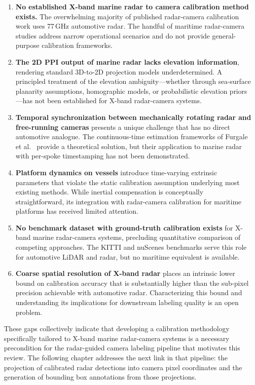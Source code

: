 \begin{enumerate}[leftmargin=*]
  \item \textbf{No established X-band marine radar to camera calibration method exists.} The overwhelming majority of published radar-camera calibration work uses 77\,GHz automotive radar. The handful of maritime radar-camera studies \cite{han2020autonomous, xu2025multistage} address narrow operational scenarios and do not provide general-purpose calibration frameworks.

  \item \textbf{The 2D PPI output of marine radar lacks elevation information}, rendering standard 3D-to-2D projection models underdetermined. A principled treatment of the elevation ambiguity---whether through sea-surface planarity assumptions, homographic models, or probabilistic elevation priors---has not been established for X-band radar-camera systems.

  \item \textbf{Temporal synchronization between mechanically rotating radar and free-running cameras} presents a unique challenge that has no direct automotive analogue. The continuous-time estimation frameworks of Furgale et al.\ \cite{furgale2013unified} provide a theoretical solution, but their application to marine radar with per-spoke timestamping has not been demonstrated.

  \item \textbf{Platform dynamics on vessels} introduce time-varying extrinsic parameters that violate the static calibration assumption underlying most existing methods. While inertial compensation is conceptually straightforward, its integration with radar-camera calibration for maritime platforms has received limited attention.

  \item \textbf{No benchmark dataset with ground-truth calibration exists} for X-band marine radar-camera systems, precluding quantitative comparison of competing approaches. The KITTI \cite{Geiger2012KITTI} and nuScenes \cite{Caesar2020nuScenes} benchmarks serve this role for automotive LiDAR and radar, but no maritime equivalent is available.

  \item \textbf{Coarse spatial resolution of X-band radar} places an intrinsic lower bound on calibration accuracy that is substantially higher than the sub-pixel precision achievable with automotive radar. Characterizing this bound and understanding its implications for downstream labeling quality is an open problem.
\end{enumerate}

These gaps collectively indicate that developing a calibration methodology specifically tailored to X-band marine radar-camera systems is a necessary precondition for the radar-guided camera labeling pipeline that motivates this review. The following chapter addresses the next link in that pipeline: the projection of calibrated radar detections into camera pixel coordinates and the generation of bounding box annotations from those projections.
